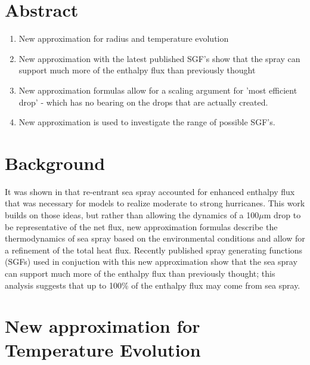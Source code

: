 \documentclass[10pt,a4paper]{article}
\begin{document}
 \renewcommand{\theenumi}{\Roman{enumi}}
 \renewcommand{\theenumii}{\arabic{enumii}}
 \renewcommand{\theenumiii}{\alpha{enumiii}}
 
\section{Abstract}
\large
\begin{enumerate}
\item New approximation for radius and temperature evolution
\item New approximation with the latest published SGF's show that the spray can support much more of the enthalpy flux than previously thought
\item New approximation formulas allow for a scaling argument for 'most efficient drop' - which has no bearing on the drops that are actually created.
\item New approximation is used to investigate the range of possible SGF's.
\end{enumerate}

 \section{Background}
 
It was shown in \citet{Andreas2001} that re-entrant sea spray accounted for enhanced enthalpy flux that was necessary for models to realize moderate to strong hurricanes. This work builds on those ideas, but rather than allowing the dynamics of a 100$\mu$m drop to be representative of the net flux, new approximation formulas describe the thermodynamics of sea spray based on the environmental conditions and allow for a refinement of the total heat flux. Recently published spray generating functions (SGFs) used in conjuction with this new approximation show that the sea spray can support much more of the enthalpy flux than previously thought; this analysis suggests that up to 100\% of the enthalpy flux may come from sea spray.

\section{New approximation for Temperature Evolution}
\end{document}
